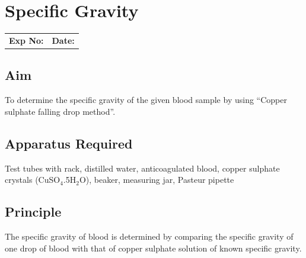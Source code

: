 \documentclass[a4paper,12pt,openany,twoside]{book}
\begin{document}
														\chapter*{\centering Specific Gravity}

														\begin{tabular}{p{5in} p{1in}}
															\textbf{Exp No:}  & \textbf{Date:}\\
														\end{tabular}

														\section*{Aim}
														To determine the specific gravity of the given blood sample by using “Copper sulphate falling drop method”.

														\section*{Apparatus Required}

															Test tubes with rack, distilled water, anticoagulated blood, copper sulphate crystals (CuSO$_4$.5H$_2$O), beaker, measuring jar, Pasteur pipette
															\section*{Principle}
															The specific gravity of blood is determined by comparing the specific gravity of one drop of blood with that of copper sulphate solution of known specific gravity.
\end{document}
